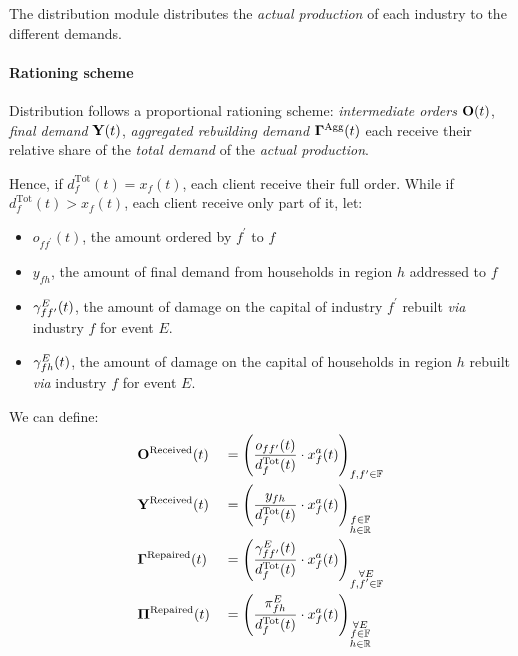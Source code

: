 \documentclass[main.tex]{subfiles}
\begin{document}
The distribution module distributes the \emph{actual production} of each industry
to the different demands.

\paragraph{Rationing scheme}
\label{sec:rationing-scheme}

Distribution follows a proportional rationing scheme: \emph{intermediate orders} $\mathbf{O}(t)$, \emph{final demand}
$\mathbf{Y}(t)$, \emph{aggregated rebuilding demand} $\mathbf{\Gamma}^{\textrm{Agg}}(t)$ each
receive their relative share of the \emph{total demand} of the \emph{actual
  production}.

Hence, if \(d_f^{\textrm{Tot}}(t) = x_f(t)\), each client receive their full order. While if \(d_f^{\textrm{Tot}}(t) > x_f(t)\),
each client receive only part of it, let:
\begin{itemize}
\item $o_{ff^{\prime}}(t)$, the amount ordered by $f^{\prime}$ to $f$
\item $y_{fh}$, the amount of final demand from households in region $h$ addressed to $f$
\item $\gamma^{E}_{ff^{\prime}}(t)$, the amount of damage on the capital of industry
  $f^{\prime}$ rebuilt \emph{via} industry $f$ for event $E$.
\item $\gamma^{E}_{fh}(t)$, the amount of damage on the capital of
  households in region $h$ rebuilt \emph{via} industry $f$ for event $E$.
\end{itemize}

We can define:
\begin{alignat*}{4}
  &\mathbf{O}^{\textrm{Received}}(t) &&= \left ( \frac{o_{ff^{\prime}}(t)}{d^{\textrm{Tot}}_f(t)} \cdot x^a_f(t) \right )_{f,f^{\prime}\in \mathbb{F}}\\
  &\mathbf{Y}^{\textrm{Received}}(t) &&= \left (
                                  \frac{y_{fh}}{d^{\textrm{Tot}}_f(t)}\cdot
                                  x^a_f(t) \right )_{\substack{f\in \mathbb{F}\\h
  \in \mathbb{R}}}\\
  &\mathbf{\Gamma}^{\textrm{Repaired}}(t) &&= \left ( \frac{\gamma^{E}_{ff^{\prime}}(t)
                                     }{d^{\textrm{Tot}}_f(t)} \cdot x^a_f(t)
                                     \right )_{\substack{\forall E\\f,f^{\prime}\in \mathbb{F}}}\\
  &\bm{\Pi}^{\textrm{Repaired}}(t) &&= \left ( \frac{\pi^{E}_{fh}
                                      }{d^{\textrm{Tot}}_f(t)} \cdot x^a_f(t)
                                      \right )_{\substack{\forall E\\f\in \mathbb{F}\\h\in \mathbb{R}}}\\
\end{alignat*}
\end{document}
